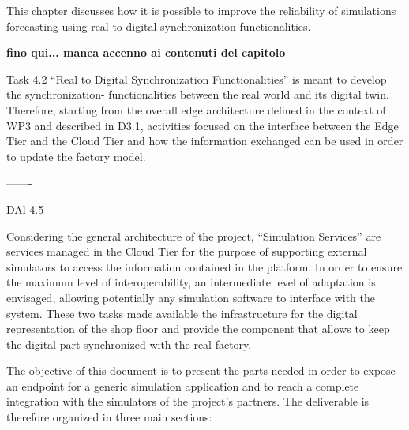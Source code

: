 This chapter discusses how it is possible to improve the reliability of simulations forecasting using real-to-digital synchronization functionalities. 

\textbf{fino qui... manca accenno ai contenuti del capitolo}
- - - - - - - -

Task 4.2 “Real to Digital Synchronization Functionalities” is meant to develop the synchronization- functionalities between the real world and its digital twin. Therefore, starting from the overall edge architecture defined in the context of WP3 and described in D3.1, activities focused on the interface between the Edge Tier and the Cloud Tier and how the information exchanged can be used in order to update the factory model.

------- 

DAl 4.5


Considering the general architecture of the project, “Simulation Services” are services managed in the Cloud Tier for the purpose of supporting external simulators to access the information contained in the platform. 
In order to ensure the maximum level of interoperability, an intermediate level of adaptation is envisaged, allowing potentially any simulation software to interface with the system.
These two tasks made available the infrastructure for the digital representation of the shop floor and provide the component that allows to keep the digital part synchronized with the real factory.




The objective of this document is to present the parts needed in order to expose an endpoint for a generic simulation application and to reach a complete integration with the simulators of the project's partners. The deliverable is therefore organized in three main sections:

